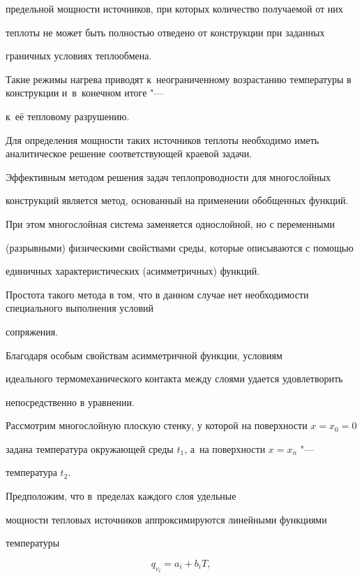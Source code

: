 предельной мощности источников, при которых количество получаемой от них

теплоты не может быть полностью отведено от конструкции при заданных

граничных условиях теплообмена.

Такие режимы нагрева приводят к~неограниченному возрастанию температуры в конструкции и~в~конечном итоге "---

к~её тепловому разрушению.

Для определения мощности таких источников теплоты необходимо иметь аналитическое решение соответствующей краевой задачи.



Эффективным методом решения задач теплопроводности для многослойных

конструкций является метод, основанный на применении обобщенных функций.

При этом многослойная система заменяется однослойной, но с переменными

(разрывными) физическими свойствами среды, которые описываются с помощью

единичных характеристических (асимметричных) функций.

Простота такого метода в том, что в данном случае нет необходимости специального выполнения условий

сопряжения.

Благодаря особым свойствам асимметричной функции, условиям

идеального термомеханического контакта между слоями удается удовлетворить

непосредственно в уравнении.



Рассмотрим многослойную плоскую стенку, у которой на поверхности \mbox{$x = x_0= 0$}

задана температура окружающей среды $t_1$, а~на поверхности \linebreak $x = x_{n} $ "---

температура $t_2 $.

Предположим, что в~пределах каждого слоя удельные

мощности тепловых источников аппроксимируются линейными функциями

температуры

\begin{equation}

\label{av:104:eq1}

 q_ {v _i} =a_i +b_i T,

\end{equation}

